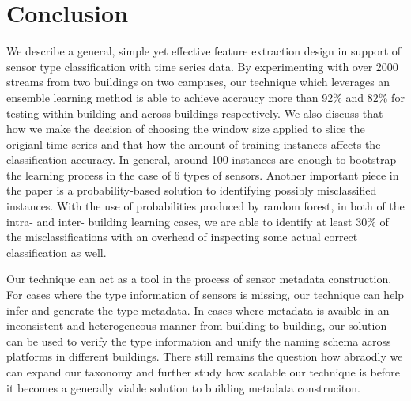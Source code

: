 \section{Conclusion}
We describe a general, simple yet effective feature extraction design in support of sensor type classification with time series data. By experimenting 
with over 2000 streams from two buildings on two campuses, our technique which leverages an ensemble learning method is able to achieve accraucy more than 
92\% and 82\% for testing within building and across buildings respectively. We also discuss that how we make the decision of choosing the window size applied 
to slice the origianl time series and that how the amount of training instances affects the classification accuracy. In general, around 100 instances are 
enough to bootstrap the learning process in the case of 6 types of sensors. Another important piece in the paper is a probability-based solution to identifying 
possibly misclassified instances. With the use of probabilities produced by random forest, in both of the intra- and inter- building learning cases, we are able 
to identify at least 30\% of the misclassifications with an overhead of inspecting some actual correct classification as well.

Our technique can act as a tool in the process of sensor metadata construction. For cases where the type information of sensors is missing, our technique can 
help infer and generate the type metadata. In cases where metadata is avaible in an inconsistent and heterogeneous manner from building to building, our solution 
can be used to verify the type information and unify the naming schema across platforms in different buildings. There still remains the question how abraodly we 
can expand our taxonomy and further study how scalable our technique is before it becomes a generally viable solution to building metadata construciton.
